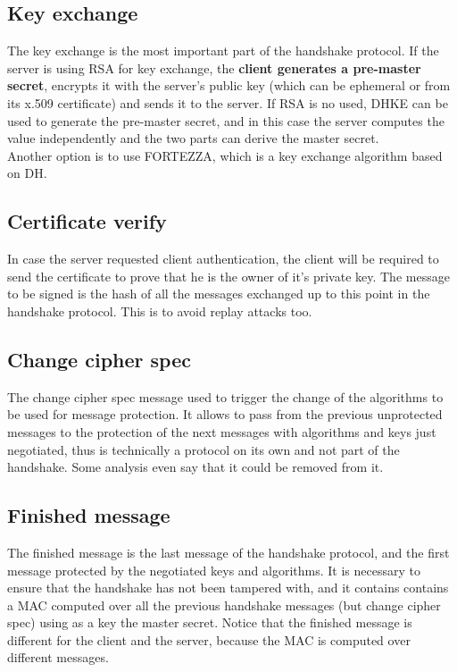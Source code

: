 \subsection{Key exchange}
The key exchange is the most important part of the handshake protocol.
If the server is using RSA for key exchange, the \textbf{client
generates a pre-master secret}, encrypts it with the server's public
key (which can be ephemeral or from its x.509 certificate) and sends
it to the server. If RSA is no used, DHKE can be used to generate the
pre-master secret, and in this case the server computes the value
independently and the two parts can derive the master secret.\\
Another option is to use FORTEZZA, which is a key exchange algorithm
based on DH.

\subsection{Certificate verify}
In case the server requested client authentication, the client will be
required to send the certificate to prove that he is the owner of it's
private key. The message to be signed is the hash of all the messages
exchanged up to this point in the handshake protocol. This is to avoid
replay attacks too.


\subsection{Change cipher spec}
The change cipher spec message used to trigger the change of the
algorithms to be used for message protection. It allows to pass from
the previous unprotected messages to the protection of the next
messages with algorithms and keys just negotiated, thus is technically
a protocol on its own and not part of the handshake. Some analysis
even say that it could be removed from it.


\subsection{Finished message}
The finished message is the last message of the handshake protocol,
and the first message protected by the negotiated keys and algorithms.
It is necessary to ensure that the handshake has not been tampered
with, and it contains contains a MAC computed over all the previous
handshake messages (but change cipher spec) using as a key the master
secret. Notice that the finished message is different for the client 
and the server, because the MAC is computed over different messages.

